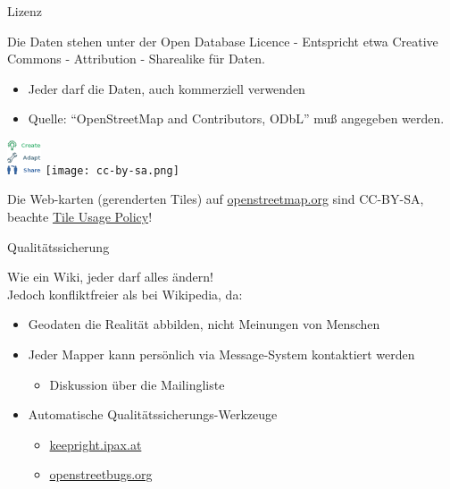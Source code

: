 \documentclass{beamer}
\begin{document}
\begin{frame}{Lizenz}

Die Daten stehen unter der Open Database Licence - Entspricht etwa Creative Commons - Attribution - Sharealike für Daten.
\begin{itemize}
  \item Jeder darf die Daten, auch kommerziell verwenden
  \item Quelle: ``OpenStreetMap and Contributors, ODbL'' muß angegeben werden.
\end{itemize}

 \begin{center}
 \includegraphics[width=1cm]{ODbL.png}
 \hspace{2cm}
 \texttt{[image: cc-by-sa.png]}
 \end{center}

\pause
Die Web-karten (gerenderten Tiles) auf \href{http://osm.org}{openstreetmap.org} sind CC-BY-SA, beachte \href{http://wiki.openstreetmap.org/wiki/Tile\_usage\_policy}{Tile Usage Policy}!

\end{frame}

\begin{frame}{Qualitätssicherung}

Wie ein Wiki, jeder darf alles ändern!\\
\pause
Jedoch konfliktfreier als bei Wikipedia, da:
\begin{itemize}
  \item Geodaten die Realität abbilden, nicht Meinungen von Menschen
  \item Jeder Mapper kann persönlich via Message-System kontaktiert werden
	\begin{itemize}
	  \item Diskussion über die Mailingliste
	\end{itemize}
\pause
  \item Automatische Qualitätssicherungs-Werkzeuge
\begin{itemize}
  \item \href{http://keepright.ipax.at/report\_map.php?zoom=14&lat=48.20808&lon=16.37221}{keepright.ipax.at}
  \item \href{http://openstreetbugs.org}{openstreetbugs.org}
\end{itemize}

\end{itemize}

\end{frame}
\end{document}
